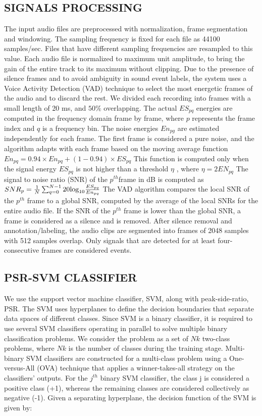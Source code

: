 \documentclass{ieeeaccess}
\begin{document}
\subsection{SIGNALS PROCESSING}
The input audio files are preprocessed with normalization, frame segmentation and windowing. The sampling frequency is fixed for each file as 44100 samples/sec. Files that have different sampling frequencies are resampled to this value. Each audio file is normalized to maximum unit amplitude, to bring the gain of the entire track to its maximum without clipping. Due to the presence of silence frames and to avoid ambiguity in sound event labels, the system uses a Voice Activity Detection (VAD) technique to select the most energetic frames of the audio and to discard the rest. We divided each recording into frames with a small length of 20 ms, and $ 50\% $ overlapping. The actual $ ES_{pq} $ energies are computed in the frequency domain frame by frame, where $ p $ represents the frame index and $ q $ is a frequency bin. The noise energies $ En_{pg} $ are estimated independently for each frame. The first frame is considered a pure noise, and the algorithm adapts with each frame based on the moving average function $E{n_{pq}} = 0.94 \times E{n_{pq}} + (1 - 0.94) \times E{S_{pq}}$ This function is computed only when the signal energy $ ES_{pq} $ is not higher than a threshold $\eta $ , where $\eta =2EN_{pq} $ The signal to noise ratio (SNR) of the $ p^{th} $frame in dB is computed as
$SN{R_p} = {\textstyle{1 \over N}}\sum\nolimits_{q = 0}^{N - 1} {20{{\log }_{10}}\frac{ES_{pq}}{En_{pq}}} $  The VAD algorithm compares the local SNR of the $ p^{th} $ frame to a global SNR,  computed by the average of the local SNRs for the entire audio file. If the SNR of the 
$ p^{th} $ frame is lower than the global SNR, a frame is considered as a silence and is removed. After silence removal and annotation/labeling, the audio clips are segmented into frames of 2048 samples with 512 samples overlap. Only signals that are detected for at least four-consecutive frames are considered events.

\subsection{PSR-SVM CLASSIFIER}
We use the support vector machine classifier, SVM, along with peak-side-ratio, PSR. The SVM uses hyperplanes to define the decision boundaries that separate data spaces of different classes. Since SVM is a binary classifier, it is required to use several SVM classifiers operating in parallel to solve multiple binary classification problems. We consider the problem as a set of $ Nk $ two-class problems, where $ Nk $ is the number of classes during the training stage. Multi-binary SVM classifiers are constructed for a multi-class problem using a One-versus-All (OVA) technique that applies a winner-takes-all strategy on the classifiers’ outputs. For the $ j^{th} $ binary SVM classifier, the class j is considered a positive class (+1), whereas the remaining classes are considered collectively as negative (-1). Given a separating hyperplane, the decision function of the SVM is given by:
\end{document}
